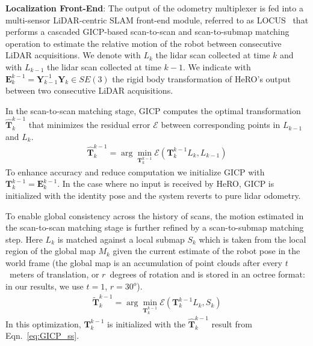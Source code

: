 \documentclass[letterpaper, 10pt, conference]{ieeeconf}      %
\newcommand{\ph}[1]{{\textbf{#1}:}} %
\newcommand{\rev}[1]{{\color{blue} #1 }} %
\begin{document}
\rev{\ph{Localization Front-End} The output of the odometry multiplexer is fed into a multi-sensor LiDAR-centric SLAM front-end module, referred to as LOCUS~\cite{Palieri2020} that performs a cascaded GICP-based scan-to-scan and scan-to-submap matching operation to estimate the relative motion of the robot between consecutive LiDAR acquisitions. We denote with $L_{k}$ the lidar scan collected at time $k$ and with $L_{k-1}$ the lidar scan collected at time $k-1$. We indicate with $\textbf{E}^{k-1}_{k} = \textbf{Y}^{-1}_{k-1}\textbf{Y}_k\in SE(3)$ the rigid body transformation of HeRO's output between two consecutive LiDAR acquisitions. %

In the scan-to-scan matching stage, GICP computes the optimal transformation $\hat{\textbf{T}}^{k-1}_{k}$ that minimizes the residual error $\mathcal{E}$ between corresponding points in $L_{k-1}$ and $L_{k}$. 
\begin{align}\label{eq:GICP_ss}
\hat{\textbf{T}}^{k-1}_{k} = \arg\min_{\textbf{T}^{k-1}_{k}} \mathcal{E} (\textbf{T}^{k-1}_{k}L_{k}, L_{k-1})
\end{align}
To enhance accuracy and reduce computation we initialize GICP with $\textbf{T}^{k-1}_{k} = \textbf{E}^{k-1}_{k}$. In the case where no input is received by HeRO, GICP is initialized with the identity pose and the system reverts to pure lidar odometry. 

To enable global consistency across the history of scans, the motion estimated in the scan-to-scan matching stage is further refined by a scan-to-submap matching step. Here $L_k$ is matched against a local submap $S_k$ which is taken from the local region of the global map $M_k$ given the current estimate of the robot pose in the world frame (the global map is an accumulation of point clouds after every $t$~meters of translation, or $r$~degrees of rotation and is stored in an octree format: in our results, we use $t = 1$, $r = 30^o$).
\begin{align}\label{eq:GICP_map}
\tilde{\textbf{T}}^{k-1}_{k} = \arg\min_{\textbf{T}^{k-1}_{k}} \mathcal{E} (\textbf{T}^{k-1}_{k}L_{k}, S_{k})
\end{align}
In this optimization, $\textbf{T}^{k-1}_{k}$ is initialized with the $\hat{\textbf{T}}^{k-1}_{k}$ result from Eqn.~\ref{eq:GICP_ss}. 

}
\end{document}
